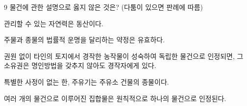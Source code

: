 \begin{question}{9}
물건에 관한 설명으로 옳지 않은 것은? (다툼이 있으면 판례에 따름)
\begin{choices}
  \item 관리할 수 있는 자연력은 동산이다.
  \item 주물과 종물의 법률적 운명을 달리하는 약정은 유효하다.
  \item 권원 없이 타인의 토지에서 경작한 농작물이 성숙하여 독립한 물건으로 인정되면, 그 소유권은 명인방법을 갖추지 않아도 경작자에게 있다.
  \item 특별한 사정이 없는 한, 주유기는 주유소 건물의 종물이다.
  \item 여러 개의 물건으로 이루어진 집합물은 원칙적으로 하나의 물건으로 인정된다.
\end{choices}
\end{question}
